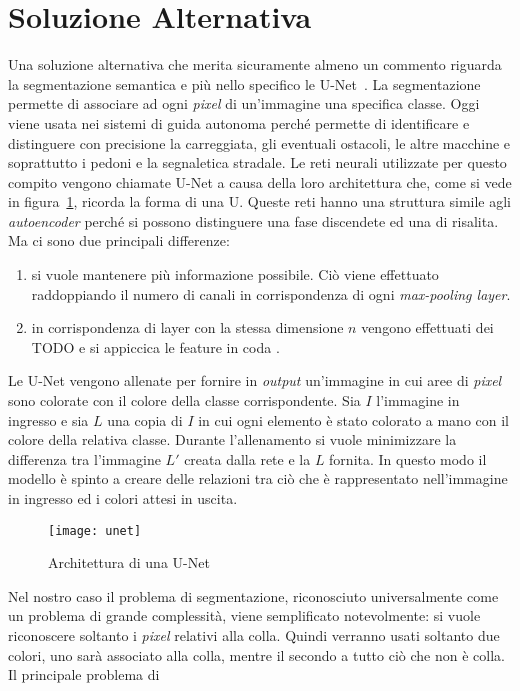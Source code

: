 \section{Soluzione Alternativa}
Una soluzione alternativa che merita  sicuramente almeno un commento riguarda la segmentazione semantica e più nello specifico le U-Net~\cite{unet}.
La segmentazione permette di associare ad ogni \textit{pixel} di un'immagine una specifica classe.
Oggi viene usata nei sistemi di guida autonoma perché permette di identificare e distinguere con precisione la carreggiata, gli eventuali ostacoli, le altre macchine e soprattutto i pedoni e la segnaletica stradale.
Le reti neurali utilizzate per questo compito vengono chiamate U-Net a causa della loro architettura che, come si vede in figura~\ref{fig:unet}, ricorda la forma di una U.
Queste reti hanno una struttura simile agli \textit{autoencoder} perché si possono distinguere una fase discendete ed una di risalita.
Ma ci sono due principali differenze:
\begin{enumerate}
  \item si vuole mantenere più informazione possibile.
    Ciò viene effettuato raddoppiando il numero di canali in corrispondenza di ogni \textit{max-pooling layer}.

  \item in corrispondenza di layer con la stessa dimensione $n$ vengono effettuati dei TODO e si appiccica le feature in coda .

\end{enumerate}
Le U-Net vengono allenate per fornire in \textit{output} un'immagine in cui aree di \textit{pixel} sono colorate con il colore della classe corrispondente.
Sia $I$ l'immagine in ingresso e sia $L$ una copia di $I$ in cui ogni elemento è stato colorato a mano con il colore della relativa classe.
Durante l'allenamento si vuole minimizzare la differenza tra l'immagine $L'$ creata dalla rete e la $L$ fornita.
In questo modo il modello è spinto a creare delle relazioni tra ciò che è rappresentato nell'immagine in ingresso ed i colori attesi in uscita.

\begin{figure}[ht]
  \begin{center}
    \texttt{[image: unet]}
    \caption{Architettura di una U-Net}
    \label{fig:unet}
  \end{center}
\end{figure}

Nel nostro caso il problema di segmentazione, riconosciuto universalmente come un problema di grande complessità, viene semplificato notevolmente: si vuole riconoscere soltanto i \textit{pixel} relativi alla colla.
Quindi verranno usati soltanto due colori, uno sarà associato alla colla, mentre il secondo a tutto ciò che non è colla.
Il principale problema di 


